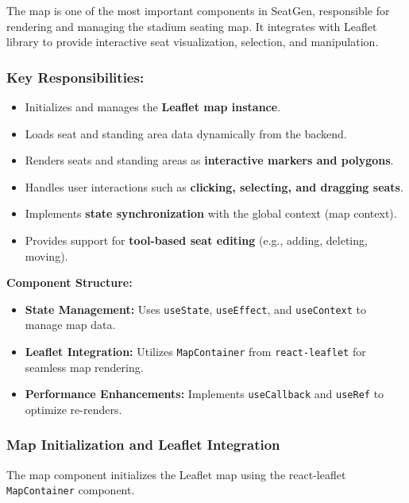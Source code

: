 The map is one of the most important components in SeatGen, responsible for rendering and managing the stadium seating map. It integrates with Leaflet library to provide interactive seat visualization, selection, and manipulation.

\subsubsection{Key Responsibilities:}
\begin{itemize}
    \item Initializes and manages the \textbf{Leaflet map instance}.
    \item Loads seat and standing area data dynamically from the backend.
    \item Renders seats and standing areas as \textbf{interactive markers and polygons}.
    \item Handles user interactions such as \textbf{clicking, selecting, and dragging seats}.
    \item Implements \textbf{state synchronization} with the global context (map context).
    \item Provides support for \textbf{tool-based seat editing} (e.g., adding, deleting, moving).
\end{itemize}

\textbf{Component Structure:}
\begin{itemize}
    \item \textbf{State Management:} Uses \texttt{useState}, \texttt{useEffect}, and \texttt{useContext} to manage map data.
    \item \textbf{Leaflet Integration:} Utilizes \texttt{MapContainer} from \texttt{react-leaflet} for seamless map rendering.
    \item \textbf{Performance Enhancements:} Implements \texttt{useCallback} and \texttt{useRef} to optimize re-renders.
\end{itemize}

\subsubsection{Map Initialization and Leaflet Integration}

The map component initializes the Leaflet map using the react-leaflet \texttt{MapContainer} component.

